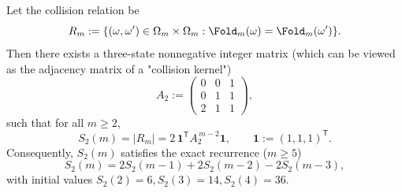 \begin{proposition}\label{prop:pom-s2-recurrence}
Let the collision relation be
$$
R_m:=\{(\omega,\omega')\in\Omega_m\times\Omega_m:\Fold_m(\omega)=\Fold_m(\omega')\}.
$$
Then there exists a three-state nonnegative integer matrix (which can be viewed as the adjacency matrix of a "collision kernel")
$$
A_2:=
\begin{pmatrix}
0&0&1\\
0&1&1\\
2&1&1
\end{pmatrix},
$$
such that for all \(m\ge 2\),
$$
S_2(m)=|R_m|
=2\,\mathbf{1}^{\mathsf T}A_2^{\,m-2}\mathbf{1},
\qquad \mathbf{1}:=(1,1,1)^{\mathsf T}.
$$
Consequently, \(S_2(m)\) satisfies the exact recurrence (\(m\ge 5\))
$$
S_2(m)=2S_2(m-1)+2S_2(m-2)-2S_2(m-3),
$$
with initial values \(S_2(2)=6,S_2(3)=14,S_2(4)=36\).
\end{proposition}
